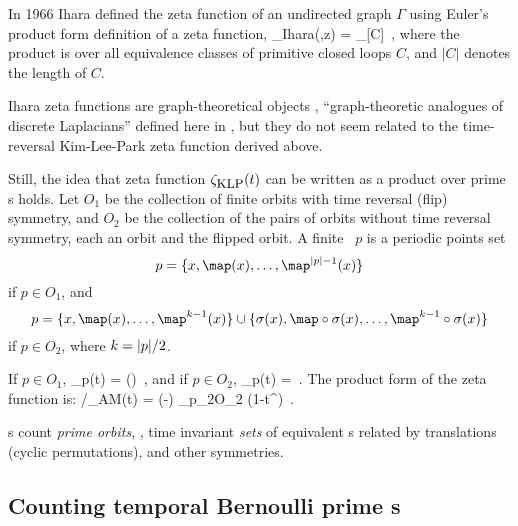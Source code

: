 In 1966 Ihara defined the zeta function of an undirected
graph $\Gamma$ using Euler's product form definition of a zeta function,
\beq
\zeta_{\mbox{\footnotesize Ihara}}(\Gamma,z) =
        \prod_{[C]}
\,,
where the product is over all equivalence classes of primitive closed
loops $C$, and $|C|$ denotes the length of $C$.

Ihara zeta functions are graph-theoretical objects%
,
``graph-theoretic analogues of discrete Laplacians''
defined here in , but they do not seem related to
the time-reversal Kim-Lee-Park zeta function
 derived above.

Still,  the idea that zeta function
$\zeta_{\mbox{\footnotesize KLP}}(t)$ can be written as a product over
prime {\orbit}s holds. Let $O_1$ be the collection of finite orbits with time
reversal (flip) symmetry, and $O_2$ be the collection of the pairs of
orbits without time reversal symmetry, each an orbit and the flipped
orbit. A finite \orbit\ $p$ is a periodic points set
\[
p = \{\ssp, \map(\ssp), \dots, \map^{\cl{p}-1}(\ssp)\}
\]
if $p \in O_1$, and
\[
p = \{\ssp, \map(\ssp), \dots, \map^{k-1}(\ssp)\} \cup
\{\Refl(\ssp), \map\circ\Refl(\ssp), \dots, \map^{k-1}\circ\Refl(\ssp)\}
\]
if $p \in O_2$, where $k=\cl{p}/2$.

If $p \in O_1$,
\beq
\zeta_{p}(t) =
\exp\left(\right)
\,,
and if $p \in O_2$,
\beq
\zeta_{p}(t) =
\,.
The product form of the zeta function is:
/\zeta_{\mbox{\footnotesize AM}}(t) =
      \;\exp\left(-\right)
\prod_{p_2\in O_2} (1-t^{})
\,.

\Tzeta s count {\em prime
orbits}, \ie, time invariant \emph{sets} of equivalent {\lattstate}s
related by translations (cyclic permutations), and other
symmetries.

\newpage %
\subsection{Counting {temporal Bernoulli} prime \po s}
\label{s:bernPrime}

